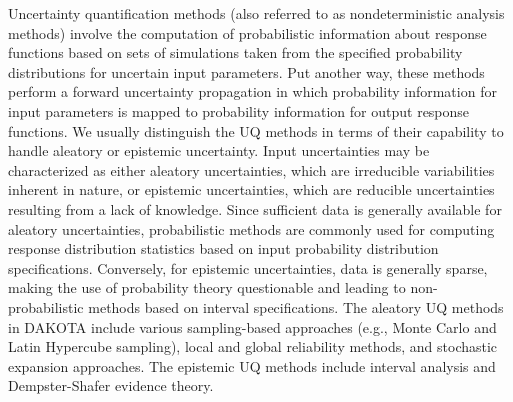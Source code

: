 Uncertainty quantification methods (also referred to as
nondeterministic analysis methods) involve the computation of
probabilistic information about response functions based on sets of
simulations taken from the specified probability distributions for
uncertain input parameters. Put another way, these methods perform a
forward uncertainty propagation in which probability information for
input parameters is mapped to probability information for output
response functions. We usually distinguish the UQ methods in terms of 
their capability to handle aleatory or epistemic uncertainty. 
Input uncertainties may be characterized as either aleatory
uncertainties, which are irreducible variabilities inherent in nature,
or epistemic uncertainties, which are reducible uncertainties
resulting from a lack of knowledge.  Since sufficient data is
generally available for aleatory uncertainties, probabilistic methods
are commonly used for computing response distribution statistics based
on input probability distribution specifications.  Conversely, for
epistemic uncertainties, data is generally sparse, making the use of
probability theory questionable and leading to non-probabilistic
methods based on interval specifications.
The aleatory UQ methods in DAKOTA include various
sampling-based approaches (e.g., Monte Carlo and Latin Hypercube
sampling), local and global reliability methods, and stochastic expansion
approaches.  The epistemic UQ methods include interval 
analysis and Dempster-Shafer evidence theory.

